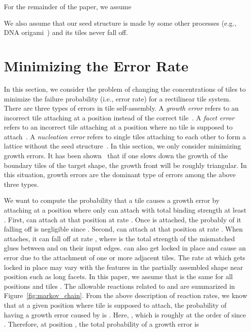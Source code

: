 \documentclass[11pt]{article}
\begin{document}
For the remainder of the paper, we assume 

We also assume that our seed structure is made by some other processes (e.g., DNA origami~\cite{r06:origami}) and its tiles never fall off.


\section{Minimizing the Error Rate}
\label{sec:error}


In this section, we consider the problem of changing the concentrations of tiles to minimize the failure probability (i.e., error rate) for a rectilinear tile system. There are three types of errors in tile self-assembly. A {\it growth error} refers to an incorrect tile attaching at a position instead of the correct tile~\cite{wb02:proof}. A {\it facet error} refers to an incorrect tile attaching at a position where no tile is supposed to attach~\cite{cg04:snaked}. A {\it nucleation error} refers to single tiles attaching to each other to form a lattice without the seed structure~\cite{sw04:zigzagtheory}. In this section, we only consider minimizing growth errors. It has been shown~\cite{wb02:proof} that if one slows down the growth of the boundary tiles of the target shape, the growth front will be roughly triangular. In this situation, growth errors are the dominant type of errors among the above three types.

We want to compute the probability that a tile  causes a growth error by attaching at a position  where only  can attach with total binding strength at least . First,  can attach at that position at rate . Once  is attached, the probably of it falling off is negligible since . Second,  can attach at that position at rate . When  attaches, it can fall off at rate , where  is the total strength of the mismatched glues between  and  on their input edges.  can also get locked in place and cause an error due to the attachment of one or more adjacent tiles. The rate  at which  gets locked in place may vary with the features in the partially assembled shape near position  such as long facets. In this paper, we assume that  is the same for all positions  and tiles . The allowable reactions related to  and  are summarized in Figure~\ref{fig:markov_chain}. From the above description of reaction rates, we know that at a given position  where tile  is supposed to attach, the probability of having a growth error caused by  is . Here, , which is  roughly at the order of  since . Therefore, at position , the total probability of a growth error is 
\end{document}
